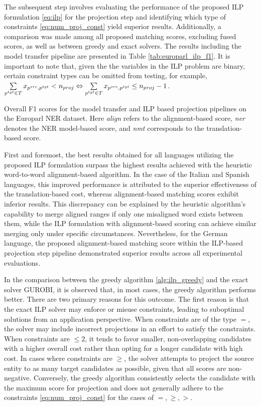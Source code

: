 The subsequent step involves evaluating the performance of the proposed ILP
formulation \eqref{eq:ilp} for the projection step and identifying which type
of constraints \eqref{eq:num_proj_const} yield superior results. Additionally, a
comparison was made among all proposed matching scores, excluding fused scores,
as well as between greedy and exact solvers. The results including the model transfer pipeline
are presented in Table \ref{tab:europarl_ilp_f1}. It is important to note that, given the
the variables in the ILP problem are binary, certain constraint types can be
omitted from testing, for example,
\( \sum\limits_{p^{tgt} \in T} x_{p^{src}, p^{tgt}} < n_{proj} \Leftrightarrow \sum\limits_{p^{tgt} \in T} x_{p^{src}, p^{tgt}} \leq n_{proj} - 1 \).

\begin{table}[t]
  \centering
  
  \caption{Overall F1 scores for the model transfer and ILP based projection pipelines
    on the Europarl NER dataset. Here \textit{align} refers to the alignment-based score,
    \textit{ner} denotes the NER model-based score, and \textit{nmt} corresponds to
  the translation-based score.}
  \label{tab:europarl_ilp_f1}
\end{table}

First and foremost, the best results obtained for all languages utilizing the
proposed ILP formulation surpass the highest results achieved with the heuristic
word-to-word alignment-based algorithm. In the case of the Italian and Spanish languages,
this improved performance is attributed to the superior effectiveness of the
translation-based cost, whereas alignment-based matching scores exhibit inferior results.
This discrepancy can be explained by the heuristic algorithm's capability to merge aligned
ranges if only one misaligned word exists between them, while the ILP formulation with
alignment-based scoring can achieve similar merging only under specific circumstances.
Nevertheless, for the German language, the proposed alignment-based matching score
within the ILP-based projection step pipeline demonstrated superior results across
all experimental evaluations.

In the comparison between the greedy algorithm \ref{alg:ilp_greedy} and the exact solver
GUROBI, it is observed that, in most cases, the greedy algorithm performs better.
There are two primary reasons for this outcome. The first reason is that the exact
ILP solver may enforce or misuse constraints, leading to suboptimal solutions from an
application perspective. When constraints are of the type \( = \), the solver may
include incorrect projections in an effort to satisfy the constraints. When constraints
are \( \leq 2 \), it tends to favor smaller, non-overlapping candidates with a higher
overall cost rather than opting for a longer candidate with high cost. In cases where
constraints are \( \geq \), the solver attempts to project the source entity to as many
target candidates as possible, given that all scores are non-negative.
Conversely, the greedy algorithm consistently selects the candidate with the maximum score
for projection and does not generally adhere to the constraints \eqref{eq:num_proj_const}
for the cases of \( =, \geq, > \).

